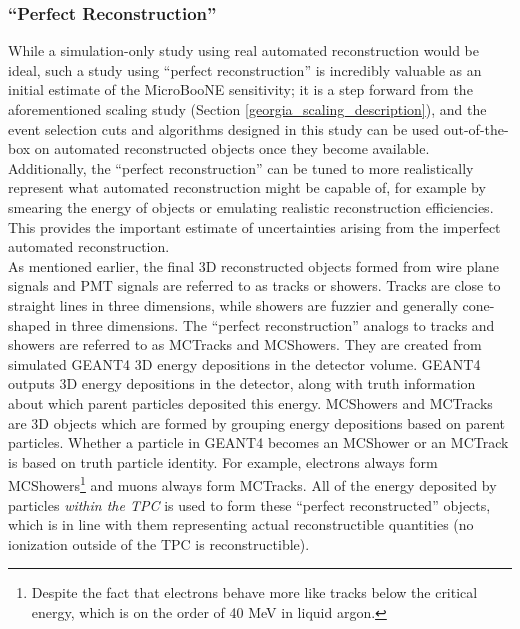 \subsubsection{``Perfect Reconstruction''}\label{perfectreco_section}
While a simulation-only study using real automated reconstruction would be ideal, such a study using ``perfect reconstruction'' is incredibly valuable as an initial estimate of the MicroBooNE sensitivity; it is a step forward from the aforementioned scaling study (Section \ref{georgia_scaling_description}), and the event selection cuts and algorithms designed in this study can be used out-of-the-box on automated reconstructed objects once they become available. Additionally, the ``perfect reconstruction'' can be tuned to more realistically represent what automated reconstruction might be capable of, for example by smearing the energy of objects or emulating realistic reconstruction efficiencies. This provides the important estimate of uncertainties arising from the imperfect automated reconstruction.\\

As mentioned earlier, the final 3D reconstructed objects formed from wire plane signals and PMT signals are referred to as tracks or showers. Tracks are close to straight lines in three dimensions, while showers are fuzzier and generally cone-shaped in three dimensions. The ``perfect reconstruction'' analogs to tracks and showers are referred to as {\sc MCTracks} and {\sc MCShowers}. They are created from simulated {\sc GEANT4} 3D energy depositions in the detector volume. {\sc GEANT4} outputs 3D energy depositions in the detector, along with truth information about which parent particles deposited this energy. {\sc MCShowers} and {\sc MCTracks} are 3D objects which are formed by grouping energy depositions based on parent particles. Whether a particle in {\sc GEANT4} becomes an {\sc MCShower} or an {\sc MCTrack} is based on truth particle identity. For example, electrons always form {\sc MCShower}s\footnote{Despite the fact that electrons behave more like tracks below the critical energy, which is on the order of 40 MeV in liquid argon.} and muons always form {\sc MCTrack}s. All of the energy deposited by particles \textit{within the TPC} is used to form these ``perfect reconstructed'' objects, which is in line with them representing actual reconstructible quantities (no ionization outside of the TPC is reconstructible).\\

